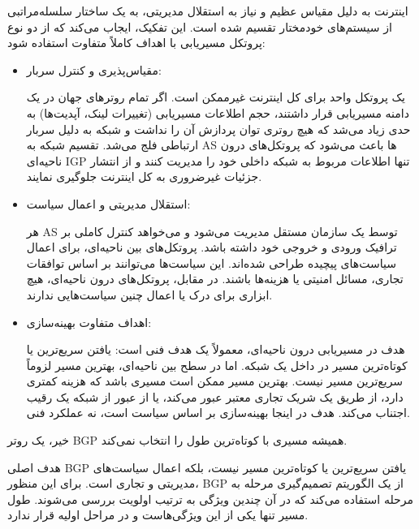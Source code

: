 

اینترنت به دلیل مقیاس عظیم و نیاز به استقلال مدیریتی، به یک ساختار سلسله‌مراتبی از سیستم‌های خودمختار تقسیم شده است. این تفکیک، ایجاب می‌کند که از دو نوع پروتکل مسیریابی با اهداف کاملاً متفاوت استفاده شود:

\begin{itemize}

\item{ مقیاس‌پذیری و کنترل سربار:}

یک پروتکل واحد برای کل اینترنت غیرممکن است. اگر تمام روترهای جهان در یک دامنه مسیریابی قرار داشتند، حجم اطلاعات مسیریابی (تغییرات لینک، آپدیت‌ها) به حدی زیاد می‌شد که هیچ روتری توان پردازش آن را نداشت و شبکه به دلیل سربار ارتباطی فلج می‌شد. تقسیم شبکه به {AS} ها باعث می‌شود که پروتکل‌های {درون ناحیه‌ای IGP} تنها اطلاعات مربوط به شبکه داخلی خود را مدیریت کنند و از انتشار جزئیات غیرضروری به کل اینترنت جلوگیری نمایند.

\item{ استقلال مدیریتی و اعمال سیاست:}

هر {AS} توسط یک سازمان مستقل مدیریت می‌شود و می‌خواهد کنترل کاملی بر ترافیک ورودی و خروجی خود داشته باشد. پروتکل‌های بین ناحیه‌ای، برای اعمال سیاست‌های پیچیده طراحی شده‌اند. این سیاست‌ها می‌توانند بر اساس توافقات تجاری، مسائل امنیتی یا هزینه‌ها باشند. در مقابل، پروتکل‌های درون ناحیه‌ای، هیچ ابزاری برای درک یا اعمال چنین سیاست‌هایی ندارند.

\item{ اهداف متفاوت بهینه‌سازی:}

هدف در مسیریابی {درون ناحیه‌ای}، معمولاً یک هدف فنی است: یافتن سریع‌ترین یا کوتاه‌ترین مسیر در داخل یک شبکه. اما در سطح {بین ناحیه‌ای}، بهترین مسیر لزوماً سریع‌ترین مسیر نیست. بهترین مسیر ممکن است مسیری باشد که هزینه کمتری دارد، از طریق یک شریک تجاری معتبر عبور می‌کند، یا از عبور از شبکه یک رقیب اجتناب می‌کند. هدف در اینجا بهینه‌سازی بر اساس {سیاست} است، نه عملکرد فنی.
\end{itemize}




خیر، یک روتر {BGP} همیشه مسیری با کوتاه‌ترین طول  را انتخاب {نمی‌کند}.

هدف اصلی {BGP} یافتن سریع‌ترین یا کوتاه‌ترین مسیر نیست، بلکه {اعمال سیاست‌های} مدیریتی و تجاری است. برای این منظور، {BGP} از یک الگوریتم تصمیم‌گیری مرحله به مرحله استفاده می‌کند که در آن چندین ویژگی به ترتیب اولویت بررسی می‌شوند. طول مسیر  تنها یکی از این ویژگی‌هاست و در مراحل اولیه قرار ندارد.

